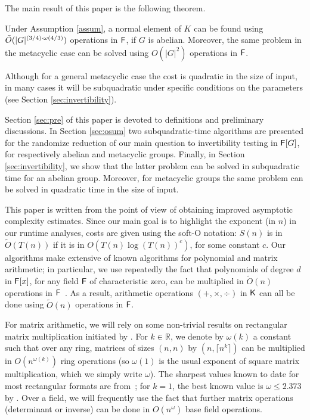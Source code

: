 The main result of this paper is the following theorem.

\begin{theorem}
Under Assumption \ref{assum}, a normal element of $K$ can be found using
$\tilde{O}(\vert G \vert ^{(3/4)\cdot \omega(4/3)})$ operations in ${\mathsf{F}}$, if $G$ is abelian. Moreover, the same problem 
in the metacyclic case can be solved using $O(\vert G \vert^2)$ operations 
in ${\mathsf{F}}$.
\end{theorem}

Although for a general metacyclic case the cost is quadratic in the 
size of input, in many cases it will be subquadratic under specific 
conditions on the parameters (see Section \ref{sec:invertibility}).

Section \ref{sec:pre} of this paper is devoted to definitions and
preliminary discussions.  In Section \ref{sec:osum} two subquadratic-time
algorithms are presented for the randomize reduction of our main question
to invertibility testing in ${\mathsf{F}}[G]$, for respectively abelian and
metacyclic groups.  Finally, in Section \ref{sec:invertibility}, we show
that the latter problem can be solved in subquadratic time for an abelian group.
Moreover, for metacyclic groups the same problem can be solved in quadratic time 
in the size of input.

This paper is written from the point of view of obtaining improved
asymptotic complexity estimates. Since our main goal is to highlight the
exponent (in $n$) in our runtime analyses, costs are given using the soft-O
notation: $S(n)$ is in $\tilde{O}(T(n))$ if it is in
$O(T(n) \log(T(n))^c)$, for some constant $c$. Our algorithms make
extensive of known algorithms for polynomial and matrix arithmetic; in
particular, we use repeatedly the fact that polynomials of degree $d$ in
${\mathsf{F}}[x]$, for any field ${\mathsf{F}}$ of characteristic zero, can be multiplied in
$\tilde{O}(n)$ operations in ${\mathsf{F}}$~\cite{ScSt71}. As a result, arithmetic 
operations $(+,\times,\div)$ in ${\mathsf{K}}$ can all be done using $\tilde{O}(n)$ 
operations in ${\mathsf{F}}$.

For matrix arithmetic, we will rely on some non-trivial results on
rectangular matrix multiplication initiated by . For $k \in
\mathbb{R}$, we denote by $\omega(k)$ a constant such that over any
ring, matrices of sizes $(n,n)$ by $(n,\lceil n^k \rceil)$ can be
multiplied in $O(n^{\omega(k)})$ ring operations (so $\omega(1)$ is
the usual exponent of square matrix multiplication, which we simply
write $\omega$).  The sharpest values known to date for most
rectangular formats are from~\cite{LeGall}; for $k=1$, the best known
value is $\omega \le 2.373$ by . Over a field, we will
frequently use the fact that further matrix operations (determinant or
inverse) can be done in $O(n^\omega)$ base field operations.


